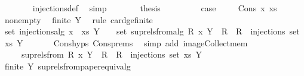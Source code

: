 \begin{isabellebody}
\ \ \ \ \ \ \isamarkupfalse%
\ injections{\isacharunderscore}def\ \isamarkupfalse%
\ simp\isanewline
\ \ \ \ \isamarkupfalse%
\ \isamarkupfalse%
\ {\isacharquery}thesis\ \isacommand{{\isachardot}}\isamarkupfalse%
\isanewline
\ \ \isamarkupfalse%
\isanewline
\ \ \isamarkupfalse%
\ \isamarkupfalse%
\ {\isacharquery}case\ \isacommand{{\isachardot}}\isamarkupfalse%
\isanewline
{}\isamarkupfalse%
\isanewline
\ \ \isamarkupfalse%
\ {\isacharparenleft}Cons\ x\ xs{\isacharparenright}\isanewline
\isanewline
\ \ \isamarkupfalse%
\ non{\isacharunderscore}empty\ \isamarkupfalse%
\ {\isachardoublequoteopen}finite\ Y{\isachardoublequoteclose}\ \isamarkupfalse%
\ {\isacharparenleft}rule\ card{\isacharunderscore}ge{\isacharunderscore}{}{\isacharunderscore}finite{\isacharparenright}\isanewline
\ \ \isanewline
\ \ \isanewline
\isanewline
\ \ \isanewline
\ \ \isamarkupfalse%
\ {\isachardoublequoteopen}set\ {\isacharparenleft}injections{\isacharunderscore}alg\ {\isacharparenleft}x\ {\isacharhash}\ xs{\isacharparenright}\ Y{\isacharparenright}\ {\isacharequal}\ {\isacharparenleft}{\isasymUnion}\ {\isacharbraceleft}\ set\ {\isacharparenleft}sup{\isacharunderscore}rels{\isacharunderscore}from{\isacharunderscore}alg\ R\ x\ Y{\isacharparenright}\ {\isacharbar}\ R\ {\isachardot}\ R\ {\isasymin}\ injections\ {\isacharparenleft}set\ xs{\isacharparenright}\ Y\ {\isacharbraceright}{\isacharparenright}{\isachardoublequoteclose}\isanewline
\ \ \ \ \isamarkupfalse%
\ Cons{\isachardot}hyps\ Cons{\isachardot}prems\ \isamarkupfalse%
\ {\isacharparenleft}simp\ add{\isacharcolon}\ image{\isacharunderscore}Collect{\isacharunderscore}mem{\isacharparenright}\isanewline
\ \ \isanewline
\ \ \isanewline
\ \ \isamarkupfalse%
\ \isamarkupfalse%
\ {\isachardoublequoteopen}{\isasymdots}\ {\isacharequal}\ {\isacharparenleft}{\isasymUnion}\ {\isacharbraceleft}\ sup{\isacharunderscore}rels{\isacharunderscore}from\ R\ x\ Y\ {\isacharbar}\ R\ {\isachardot}\ R\ {\isasymin}\ injections\ {\isacharparenleft}set\ xs{\isacharparenright}\ Y\ {\isacharbraceright}{\isacharparenright}{\isachardoublequoteclose}\isanewline
\ \ \ \ \isamarkupfalse%
\ {\isacharbackquoteopen}finite\ Y{\isacharbackquoteclose}\ sup{\isacharunderscore}rels{\isacharunderscore}from{\isacharunderscore}paper{\isacharunderscore}equiv{\isacharunderscore}alg\ \isamarkupfalse%

\end{isabellebody}
